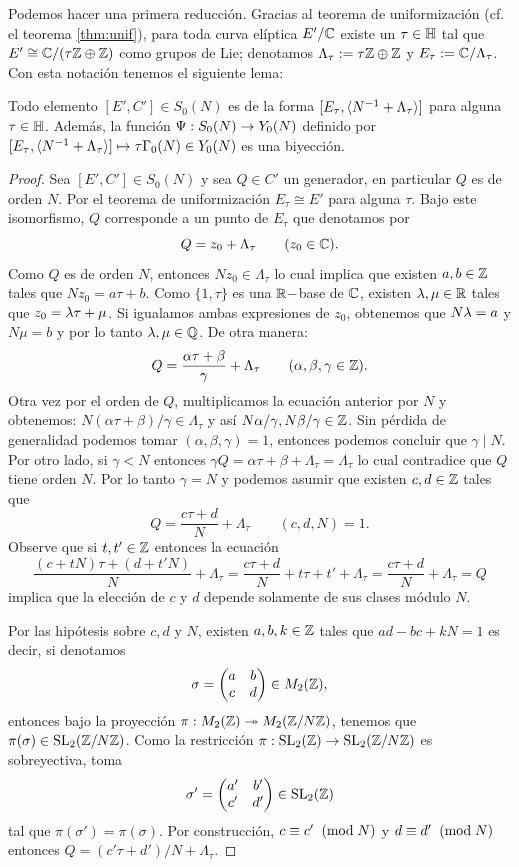 \documentclass[../../tesis_maestria]{subfiles}
\begin{document}
Podemos hacer una primera reducción. Gracias al teorema de uniformización (cf. el teorema \ref{thm:unif}), para toda curva elíptica $E'/\mathbb{C}$ existe un $\tau\in\mathbb{H}$ tal que $E'\cong \mathbb{C}/(\tau\mathbb{Z}\oplus\mathbb{Z})$ como grupos de Lie; denotamos $\Lambda_\tau:=\tau\mathbb{Z}\oplus\mathbb{Z}$ y  $E_\tau:=\mathbb{C}/\Lambda_\tau$. Con esta notación tenemos el siguiente lema:

\begin{lema}\label{lema:espacio_moduli_Y_0(N)}
	Todo elemento $[E',C']\in S_0(N)$ es de la forma $[E_\tau,\langle N^{-1}+\Lambda_\tau \rangle]$ para alguna $\tau\in\mathbb{H}$. Además, la función $\Psi:S_0(N)\rightarrow Y_0(N)$ definido por $[E_\tau,\langle N^{-1}+\Lambda_\tau \rangle]\mapsto \tau\Gamma_0(N)\in Y_0(N)$ es una biyección.
\end{lema}

\begin{proof}
Sea $[E',C']\in S_0(N)$ y sea $Q\in C'$ un generador, en particular $Q$ es de orden $N$. Por el teorema de uniformización $E_\tau\cong E'$ para alguna $\tau$. Bajo este isomorfismo, $Q$ corresponde a un punto de $E_\tau$ que denotamos por
\[	
	Q=z_0+\Lambda_\tau\qquad(z_0\in\mathbb{C}).
\]
Como $Q$ es de orden $N$, entonces $Nz_0\in\Lambda_\tau$ lo cual implica que existen $a,b\in\mathbb{Z}$ tales que $Nz_0=a\tau+b$. Como $\{1,\tau\}$ es una $\mathbb{R}-$base de $\mathbb{C}$, existen $\lambda,\mu\in\mathbb{R}$ tales que $z_0=\lambda\tau+\mu$. Si igualamos ambas expresiones de $z_0$, obtenemos que $N\lambda=a$ y $N\mu=b$ y por lo tanto $\lambda,\mu\in\mathbb{Q}$. De otra manera:
\[
	Q=\frac{\alpha\tau+\beta}{\gamma}+\Lambda_\tau\qquad(\alpha,\beta,\gamma\in\mathbb{Z}).
\]
Otra vez por el orden de $Q$, multiplicamos la ecuación anterior por $N$ y obtenemos: $N(\alpha\tau+\beta)/\gamma\in\Lambda_\tau$ y así $N\alpha/\gamma,N\beta/\gamma\in\mathbb{Z}$. Sin pérdida de generalidad podemos tomar $(\alpha,\beta,\gamma)=1$, entonces podemos concluir que $\gamma\mid N$. Por otro lado, si $\gamma<N$ entonces $\gamma Q=\alpha\tau+\beta+\Lambda_\tau=\Lambda_\tau$ lo cual contradice que $Q$ tiene orden $N$. Por lo tanto $\gamma=N$ y podemos asumir que existen $c,d\in\mathbb{Z}$ tales que
\[
	Q=\frac{c\tau+d}{N}+\Lambda_\tau\qquad(c,d,N)=1.
\]
Observe que si $t,t'\in\mathbb{Z}$ entonces la ecuación
\[
	\frac{(c+tN)\tau+(d+t'N)}{N}+\Lambda_\tau=
	\frac{c\tau+d}{N}+t\tau+t'+\Lambda_\tau=
	\frac{c\tau+d}{N}+\Lambda_\tau=Q
\]
implica que la elección de $c$ y $d$ depende solamente de sus clases módulo $N$.

Por las hipótesis sobre $c,d$ y $N$, existen $a,b,k\in\mathbb{Z}$ tales que $ad-bc+kN=1$ es decir, si denotamos
\[
	\sigma=\begin{pmatrix}a & b\\ c & d\end{pmatrix}\in M_2(\mathbb{Z}),
\]
entonces bajo la proyección $\pi:M_2(\mathbb{Z})\twoheadrightarrow M_2(\mathbb{Z}/N\mathbb{Z})$, tenemos que $\pi(\sigma)\in\mathrm{SL}_2(\mathbb{Z}/N\mathbb{Z})$. Como la restricción $\pi:\mathrm{SL}_2(\mathbb{Z})\rightarrow\mathrm{SL}_2(\mathbb{Z}/N\mathbb{Z})$ es sobreyectiva, toma $$\sigma'=\begin{pmatrix}a' & b'\\ c' & d'\end{pmatrix}\in\mathrm{SL}_2(\mathbb{Z})$$ tal que $\pi(\sigma')=\pi(\sigma)$. Por construcción, $c\equiv c'\;\;(\mathrm{mod}\; N)$ y $d\equiv d'\;\;(\mathrm{mod}\; N)$ entonces
$Q=(c'\tau+d')/N+\Lambda_{\tau}$.


\end{proof}
\end{document}
